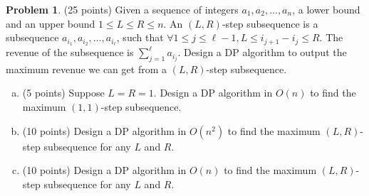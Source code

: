 \documentclass{article}
\theoremstyle{definition}
\newtheorem{prob}{Problem}
\begin{document}
	\begin{prob}
		(25 points) Given a sequence of integers $a_{1}, a_{2}, \ldots, a_{n}$, a lower bound and an upper bound $1 \leq L \leq R \leq n$. An $(L, R)$-step subsequence is a subsequence $a_{i_{1}}, a_{i_{2}}, \ldots, a_{i_{\ell}}$, such that $\forall 1 \leq j \leq \ell-1, L \leq i_{j+1}-i_{j} \leq R$. The revenue of the subsequence is $\sum_{j=1}^{\ell} a_{i_{j}}$. Design a DP algorithm to output the maximum revenue we can get from a $(L, R)$-step subsequence.
		\begin{enumerate}[(a)]
			\item (5 points) Suppose $L=R=1$. Design a DP algorithm in $O(n)$ to find the maximum $(1,1)$-step subsequence.
			\item (10 points) Design a DP algorithm in $O\left(n^{2}\right)$ to find the maximum $(L, R)$-step subsequence for any $L$ and $R$.
			\item (10 points) Design a DP algorithm in $O(n)$ to find the maximum $(L, R)$-step subsequence for any $L$ and $R$.
		\end{enumerate}
	\end{prob}
	
\end{document}
